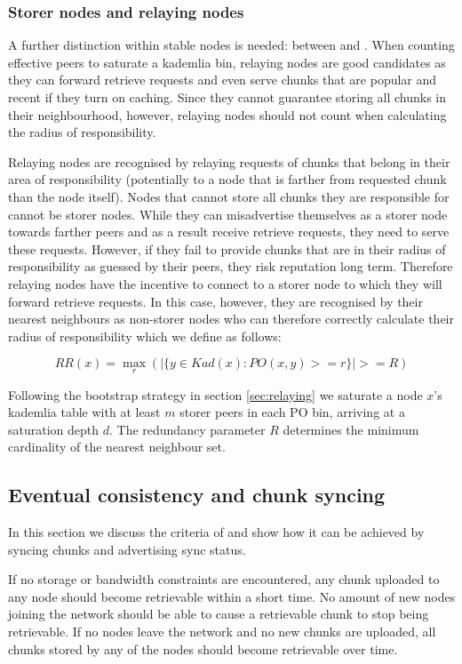 \subsubsection{Storer nodes and relaying nodes}

A further distinction within stable nodes is needed: between  and  .
When counting effective peers to saturate a kademlia bin, relaying nodes are good candidates as they can forward retrieve requests and even serve chunks that are popular and recent if they turn on caching. 
Since they cannot guarantee storing all chunks in their neighbourhood, however, relaying  nodes should not count when calculating the radius of responsibility. 

Relaying nodes are recognised by relaying requests of chunks that belong in their area of responsibility (potentially to a node that is farther from requested chunk than the node itself). Nodes that cannot store all chunks they are responsible for cannot be storer nodes. While they can misadvertise themselves as a storer node towards farther peers and as a result receive retrieve requests, they need to serve these requests. However, if they fail to provide chunks that are in their radius of responsibility as guessed by their peers, they risk reputation long term. Therefore relaying nodes have the incentive to connect to a storer node to which they will forward retrieve requests. In this case, however, they are recognised by their nearest neighbours as non-storer nodes who can therefore correctly calculate their radius of responsibility which we define as follows:

$$
\mathit{RR(x)} = \max_r(|\{y\in \mathit{Kad}(x): \mathit{PO}(x, y)>=r\}| >= R)
$$

Following the bootstrap strategy in section \ref{sec:relaying} we saturate a node $x$'s kademlia table with at least $m$ storer peers in each PO bin, arriving at a saturation depth $d$. The redundancy parameter $R$ determines the minimum cardinality of the nearest neighbour set. 

\subsection{Eventual consistency and chunk syncing}

In this section we discuss the criteria of  and show how it can be achieved by syncing chunks and advertising sync status.

If no storage or bandwidth constraints are encountered, any chunk uploaded to any node should become retrievable within a short time. No amount of new nodes joining the network should be able to cause a retrievable chunk to stop being retrievable. If no nodes leave the network and no new chunks are uploaded, all chunks stored by any of the nodes should become retrievable over time.



